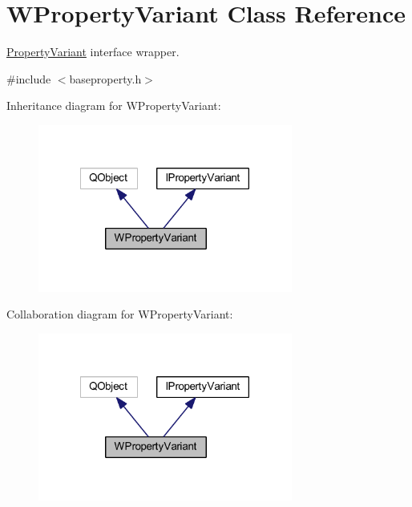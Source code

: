 \hypertarget{class_w_property_variant}{\section{W\-Property\-Variant Class Reference}
\label{class_w_property_variant}
}


\hyperlink{class_property_variant}{Property\-Variant} interface wrapper.  




{\ttfamily \#include $<$baseproperty.\-h$>$}



Inheritance diagram for W\-Property\-Variant\-:
\nopagebreak
\begin{figure}[H]
\begin{center}
\leavevmode
\includegraphics[width=237pt]{class_w_property_variant__inherit__graph}
\end{center}
\end{figure}


Collaboration diagram for W\-Property\-Variant\-:
\nopagebreak
\begin{figure}[H]
\begin{center}
\leavevmode
\includegraphics[width=237pt]{class_w_property_variant__coll__graph}
\end{center}
\end{figure}
